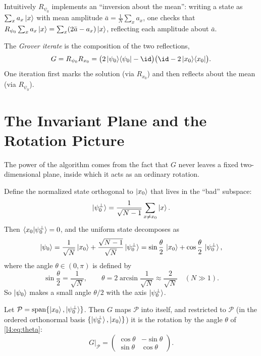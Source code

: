 Intuitively $R_{\psi_0}$ implements an ``inversion about the mean'': writing a
state as $\sum_x a_x\ket{x}$ with mean amplitude $\bar a=\tfrac1N\sum_x a_x$, one
checks that $R_{\psi_0}\sum_x a_x\ket{x}=\sum_x(2\bar a-a_x)\ket{x}$, reflecting
each amplitude about $\bar a$.

\begin{definition}
The \emph{Grover iterate} is the composition of the two reflections,
\[
  G=R_{\psi_0}R_{x_0}
   =\bigl(2\ketbra{\psi_0}{\psi_0}-\id\bigr)\bigl(\id-2\ketbra{x_0}{x_0}\bigr).
\]
One iteration first marks the solution (via $R_{x_0}$) and then reflects about the
mean (via $R_{\psi_0}$).
\end{definition}

\section{The Invariant Plane and the Rotation Picture}

The power of the algorithm comes from the fact that $G$ never leaves a fixed
two-dimensional plane, inside which it acts as an ordinary rotation.

Define the normalized state orthogonal to $\ket{x_0}$ that lives in the ``bad''
subspace:
\[
  \ket{\psi_0^{\perp}}
    =\frac{1}{\sqrt{N-1}}\sum_{x\neq x_0}\ket{x}.
\]
Then $\braket{x_0|\psi_0^{\perp}}=0$, and the uniform state decomposes as
\begin{equation}
  \ket{\psi_0}
    =\frac{1}{\sqrt N}\ket{x_0}+\frac{\sqrt{N-1}}{\sqrt N}\ket{\psi_0^{\perp}}
    =\sin\frac{\theta}{2}\,\ket{x_0}+\cos\frac{\theta}{2}\,\ket{\psi_0^{\perp}},
  \label{l4:eq:initdecomp}
\end{equation}
where the angle $\theta\in(0,\pi)$ is defined by
\begin{equation}
  \sin\frac{\theta}{2}=\frac{1}{\sqrt N},
  \qquad
  \theta=2\arcsin\frac{1}{\sqrt N}\approx\frac{2}{\sqrt N}\quad(N\gg1).
  \label{l4:eq:theta}
\end{equation}
So $\ket{\psi_0}$ makes a small angle $\theta/2$ with the axis
$\ket{\psi_0^{\perp}}$.

\begin{theorem}
\label{l4:thm:rotation}
Let $\mathcal{P}=\operatorname{span}\{\ket{x_0},\ket{\psi_0^{\perp}}\}$. Then $G$
maps $\mathcal{P}$ into itself, and restricted to $\mathcal{P}$ (in the ordered
orthonormal basis $\{\ket{\psi_0^{\perp}},\ket{x_0}\}$) it is the rotation by the
angle $\theta$ of \eqref{l4:eq:theta}:
\[
  G\big|_{\mathcal{P}}
    =\begin{pmatrix}\cos\theta & -\sin\theta\\[2pt]\sin\theta & \cos\theta\end{pmatrix}.
\]
\end{theorem}

